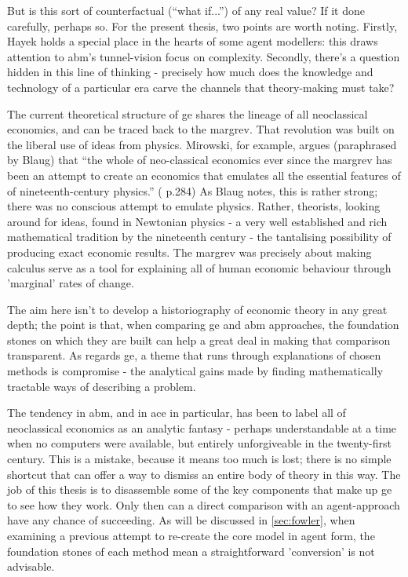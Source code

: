 But is this sort of counterfactual (``what if...'') of any real value? If it done carefully, perhaps so. For the present thesis, two points are worth noting. Firstly, Hayek holds a special place in the hearts of some agent modellers: this draws attention to \gls{abm}'s tunnel-vision focus on complexity. Secondly, there's a question hidden in this line of thinking - precisely how much does the knowledge and technology of a particular era carve the channels that theory-making must take?

The current theoretical structure of \gls{ge} shares the lineage of all neoclassical economics, and can be traced back to the \gls{margrev}. That revolution was built on the liberal use of ideas from physics. Mirowski, for example, argues (paraphrased by Blaug) that ``the whole of neo-classical economics ever since the \gls{margrev} has been an attempt to create an economics that emulates all the essential features of of nineteenth-century physics.'' (\citealt{blaug_economic_1997} p.284) As Blaug notes, this is rather strong; there was no conscious attempt to emulate physics. Rather, theorists, looking around for ideas, %
found in Newtonian physics - a very well established and rich mathematical tradition by the nineteenth century - the tantalising possibility of producing exact economic results. The \gls{margrev} was precisely about making calculus serve as a tool for explaining all of human economic behaviour through 'marginal' rates of change.

The aim here isn't to develop a historiography of economic theory in any great depth; the point is that, when comparing \gls{ge} and \gls{abm} approaches, the foundation stones on which they are built can help a great deal in making that comparison transparent. As regards \gls{ge}, a theme that runs through explanations of chosen methods is compromise - the analytical gains made by finding mathematically tractable ways of describing a problem.

The tendency in \gls{abm}, and in \gls{ace} in particular, has been to label all of neoclassical economics as an analytic fantasy - perhaps understandable at a time when no computers were available, but entirely unforgiveable in the twenty-first century. 
This is a mistake, because it means too much is lost; there is no simple shortcut that can offer a way to dismiss an entire body of theory in this way. The job of this thesis is to disassemble some of the key components that make up \gls{ge} to see how they work. Only then can a direct comparison with an agent-approach have any chance of succeeding. As will be discussed in \ref{sec:fowler}, when examining a previous attempt to re-create the core model in agent form, the foundation stones of each method mean a straightforward 'conversion' is not advisable. 



